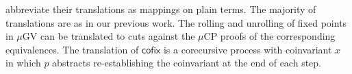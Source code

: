 \documentclass[orivec,envcountsame]{llncs}
\newcommand{\cpdual}[1]{#1^\perp}
\newcommand{\lto}{\ensuremath{\multimap}}
\newcommand{\gvtyp}[3]{#1 \vdash #2 : #3}
\newcommand{\mapname}{\mathsf{map}}
\newcommand{\map}[3]{\mapname^{#1}_{#2}(#3)}
\newcommand{\mkwd}[1]{\mathsf{#1}}
\newcommand{\link}[2]{#1 \leftrightarrow #2}
\newcommand{\cut}[4]{\mkwd{new}\:#1 \: (#3 \mid #4)}
\newcommand{\rec}[1]{\mkwd{rec}\:#1}
\newcommand{\corec}[4]{\mkwd{corec}\:{#1} \langle #2 \rangle (#3,#4)}
\newcommand{\lrkwd}{\mkwd{cofix}}
\newcommand{\cofix}{\lrkwd}
\newcommand{\tocpbig}[1]{\left\llbracket #1 \right\rrbracket}
\newcommand{\tocp}[1]{\llbracket #1 \rrbracket}
\newcommand{\mucp}{$\mu\mathrm{CP}$\xspace}
\newcommand{\mugv}{$\mu\mathrm{GV}$\xspace}
\newcommand{\secref}[1]{Section~\ref{sec:#1}}
\begin{document}
abbreviate their translations as mappings on plain terms. The majority of translations are as in our
previous work.
%
The rolling and unrolling of fixed points in \mugv can be translated to cuts against the \mucp
proofs of the corresponding equivalences.
%
The translation of $\cofix$ is a corecursive process with coinvariant $x$ in which $p$ abstracts
re-establishing the coinvariant at the end of each step.


%
%
\end{document}
